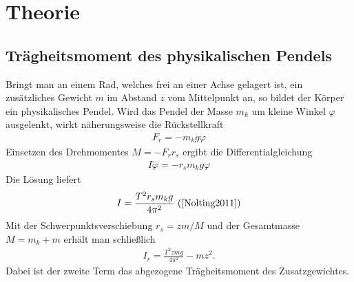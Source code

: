 \section{Theorie}
\subsection{Trägheitsmoment des physikalischen Pendels}
Bringt man an einem Rad, welches frei an einer Achse gelagert ist, ein zusätzliches Gewicht $m$ im Abstand $z$ vom Mittelpunkt an, so bildet der Körper ein physikalisches Pendel. Wird das Pendel der Masse $m_k$ um kleine Winkel $\varphi$ ausgelenkt, wirkt näherungsweise die Rückstellkraft
\begin{align}
F_r=-m_kg\varphi
\end{align}
Einsetzen des Drehmomentes $M=-F_{r}r_s$ ergibt die Differentialgleichung
\begin{align}
I\ddot{\varphi}=-r_sm_kg\varphi
\end{align}
Die Lösung liefert
\begin{align}
I=\frac{T^2r_sm_kg}{4\pi^2}\,\, \text{(\cite{Nolting2011})}
\end{align}
Mit der Schwerpunktsverschiebung $r_s=zm/M$ und der Gesamtmasse $M=m_k+m$ erhält man schließlich
\begin{align}
I_r=\frac{T^2zmg}{4\pi^2}-mz^2.
\label{eq:4}
\end{align}
Dabei ist der zweite Term das abgezogene Trägheitsmoment des Zusatzgewichtes.
